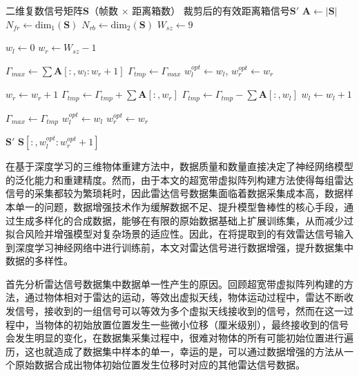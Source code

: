 \begin{algorithm}[H]
    \caption{有效距离箱定位算法}
    \label{algo:range_bin}
\begin{algorithmic}[1]
    \Require 二维复数信号矩阵$\mathbf{S}$（帧数 $\times$ 距离箱数）
    \Ensure 裁剪后的有效距离箱信号$\mathbf{S}'$
    \State $\mathbf{A} \gets |\mathbf{S}|$ 
    \State $N_{fr} \gets \text{dim}_1(\mathbf{S})$ 
    \State $N_{rb} \gets \text{dim}_2(\mathbf{S})$ 
    \State $W_{sz} \gets 9$ 
    
    \State {}
    \State $w_l \gets 0$ 
    \State $w_r \gets W_{sz}-1$ 
    
    \State $\Gamma_{max} \gets \sum\mathbf{A}[:, w_l:w_r+1]$ 
    \State $\Gamma_{tmp} \gets \Gamma_{max}$ 
    \State $w_l^{opt} \gets w_l$, $w_r^{opt} \gets w_r$ 
    
    \State {}
        \State $w_r \gets w_r + 1$ 
        \State $\Gamma_{tmp} \gets \Gamma_{tmp} + \sum\mathbf{A}[:, w_r]$ 
        \State $\Gamma_{tmp} \gets \Gamma_{tmp} - \sum\mathbf{A}[:, w_l]$ 
        \State $w_l \gets w_l + 1$ 
        
            \State $\Gamma_{max} \gets \Gamma_{tmp}$
            \State $w_l^{opt} \gets w_l$
            \State $w_r^{opt} \gets w_r$
        \EndIf
    \EndWhile
    
    \State $\mathbf{S}'$ \gets $\mathbf{S}[:, w_l^{opt}:w_r^{opt}+1]$
\end{algorithmic}
\end{algorithm}
\label{sec:aug}
在基于深度学习的三维物体重建方法中，数据质量和数量直接决定了神经网络模型的泛化能力和重建精度。然而，由于本文的超宽带虚拟阵列构建方法使得每组雷达信号的采集都较为繁琐耗时，因此雷达信号数据集面临着数据采集成本高，数据样本单一的问题，数据增强技术作为缓解数据不足、提升模型鲁棒性的核心手段，通过生成多样化的合成数据，能够在有限的原始数据基础上扩展训练集，从而减少过拟合风险并增强模型对复杂场景的适应性。因此，在将提取到的有效雷达信号输入到深度学习神经网络中进行训练前，本文对雷达信号进行数据增强，提升数据集中数据的多样性。

首先分析雷达信号数据集中数据单一性产生的原因。回顾超宽带虚拟阵列构建的方法，通过物体相对于雷达的运动，等效出虚拟天线，物体运动过程中，雷达不断收发信号，接收到的一组信号可以等效为多个虚拟天线接收到的信号，然而在这一过程中，当物体的初始放置位置发生一些微小位移（厘米级别），最终接收到的信号会发生明显的变化，在数据集采集过程中，很难对物体的所有可能初始位置进行遍历，这也就造成了数据集中样本的单一，幸运的是，可以通过数据增强的方法从一个原始数据合成出物体初始位置发生位移时对应的其他雷达信号数据。

